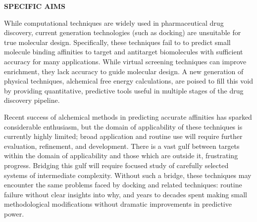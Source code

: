 \documentclass[11pt]{article}
\begin{document}





\noindent \begin{center}
{\bf SPECIFIC AIMS}
\end{center}

While computational techniques are widely used in pharmaceutical drug discovery, current generation technologies (such as docking) are unsuitable for true molecular design. 
Specifically, these techniques fail to to predict small molecule binding affinities to target and antitarget biomolecules with sufficient accuracy for many applications. 
While virtual screening techniques can improve enrichment, they lack accuracy to guide molecular design. 
A new generation of physical techniques, alchemical free energy calculations, are poised to fill this void by providing quantitative, predictive tools useful in multiple stages of the drug discovery pipeline.

Recent success of alchemical methods in predicting accurate affinities has sparked considerable enthusiasm, but the domain of applicability of these techniques is currently highly limited; broad application and routine use will require further evaluation, refinement, and development. 
There is a vast gulf between targets within the domain of applicability and those which are outside it, frustrating progress. 
Bridging this gulf will require focused study of carefully selected systems of intermediate complexity. 
Without such a bridge, these techniques may encounter the same problems faced by docking and related techniques: routine failure without clear insights into why, and years to decades spent making small methodological modifications without dramatic improvements in predictive power.
\end{document}
